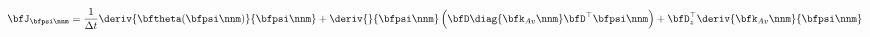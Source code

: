 \begin{equation}
\label{eq:richards-newton-deriv}
    \bfJ_{ \bfpsi\nnm} =
    \frac{1}{\Delta t} \deriv{\bftheta(\bfpsi\nnm)}{\bfpsi\nnm}
    +
    \deriv{}{\bfpsi\nnm}
    \left(
    \bfD
        \diag{\bfk_{Av}\nnm}
    \bfD^{\top}\bfpsi\nnm
    \right)
    +
    \bfD_z^{\top}
    \deriv{\bfk_{Av}\nnm}{\bfpsi\nnm}
\end{equation}
